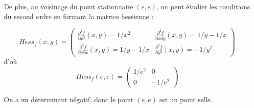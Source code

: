 {\begin{enumerate}
{			De plus, au voisinage du point stationnaire $(e,e)$, on peut étudier les conditions du second ordre en formant la matrice hessienne : 
			
			$$Hess_f(x,y)=\begin{pmatrix} 
				\frac{\partial^2 f}{\partial x^2}(x,y) = 1/x^2 & \frac{\partial^2 f}{\partial x \partial y}(x,y) = 1/y-1/x \\
				\frac{\partial^2 f}{\partial y \partial x}(x,y) = 1/y-1/x & \frac{\partial^2 f}{\partial y^2}(x,y) = -1/y^2 
			\end{pmatrix}$$
			d'où 
			$$Hess_f(e,e)=\begin{pmatrix} 
				1/e^2 &  0 \\
				0 & -1/e^2 
			\end{pmatrix}$$
			
			On a un déterminant négatif, donc le point $(e,e)$ est un point selle. 
		}
	\end{enumerate}
}
